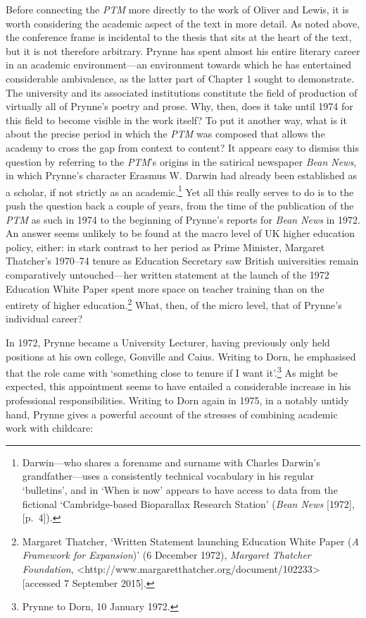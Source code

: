 \documentclass[]{article}
\begin{document}
Before connecting the \emph{PTM} more directly to the work of Oliver and
Lewis, it is worth considering the academic aspect of the text in more
detail. As noted above, the conference frame is incidental to the thesis
that sits at the heart of the text, but it is not therefore arbitrary.
Prynne has spent almost his entire literary career in an academic
environment---an environment towards which he has entertained
considerable ambivalence, as the latter part of Chapter 1 sought to
demonstrate. The university and its associated institutions constitute
the field of production of virtually all of Prynne's poetry and prose.
Why, then, does it take until 1974 for this field to become visible in
the work itself? To put it another way, what is it about the precise
period in which the \emph{PTM} was composed that allows the academy to
cross the gap from context to content? It appears easy to dismiss this
question by referring to the \emph{PTM}'s origins in the satirical
newspaper \emph{Bean News}, in which Prynne's character Erasmus W.
Darwin had already been established as a scholar, if not strictly as an
academic.\footnote{Darwin---who shares a forename and surname with
  Charles Darwin's grandfather---uses a consistently technical
  vocabulary in his regular `bulletins', and in `When is now' appears to
  have access to data from the fictional `Cambridge-based Bioparallax
  Research Station' (\emph{Bean News} {[}1972{]}, {[}p.~4{]}).} Yet all
this really serves to do is to the push the question back a couple of
years, from the time of the publication of the \emph{PTM} as such in
1974 to the beginning of Prynne's reports for \emph{Bean News} in 1972.
An answer seems unlikely to be found at the macro level of UK higher
education policy, either: in stark contrast to her period as Prime
Minister, Margaret Thatcher's 1970--74 tenure as Education Secretary saw
British universities remain comparatively untouched---her written
statement at the launch of the 1972 Education White Paper spent more
space on teacher training than on the entirety of higher
education.\footnote{Margaret Thatcher, `Written Statement launching
  Education White Paper (\emph{A Framework for Expansion})' (6 December
  1972), \emph{Margaret Thatcher Foundation},
  \textless{}http://www.margaretthatcher.org/document/102233\textgreater{}
  {[}accessed 7 September 2015{]}.} What, then, of the micro level, that
of Prynne's individual career?

In 1972, Prynne became a University Lecturer, having previously only
held positions at his own college, Gonville and Caius. Writing to Dorn,
he emphasised that the role came with `something close to tenure if I
want it'.\footnote{Prynne to Dorn, 10 January 1972.} As might be
expected, this appointment seems to have entailed a considerable
increase in his professional responsibilities. Writing to Dorn again in
1975, in a notably untidy hand, Prynne gives a powerful account of the
stresses of combining academic work with childcare:
\end{document}
